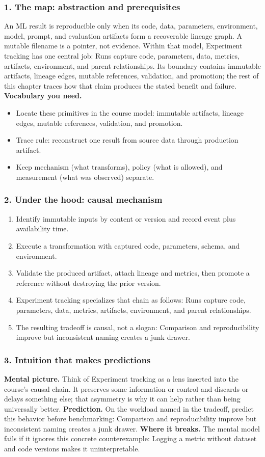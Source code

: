 \subsubsection*{1. The map: abstraction and prerequisites}
An ML result is reproducible only when its code, data, parameters, environment, model, prompt, and evaluation artifacts form a recoverable lineage graph. A mutable filename is a pointer, not evidence.
Within that model, Experiment tracking has one central job: Runs capture code, parameters, data, metrics, artifacts, environment, and parent relationships. Its boundary contains immutable artifacts, lineage edges, mutable references, validation, and promotion; the rest of this chapter traces how that claim produces the stated benefit and failure.
\textbf{Vocabulary you need.}\begin{itemize}
\item Locate these primitives in the course model: immutable artifacts, lineage edges, mutable references, validation, and promotion.
\item Trace rule: reconstruct one result from source data through production artifact.
\item Keep mechanism (what transforms), policy (what is allowed), and measurement (what was observed) separate.
\end{itemize}
\subsubsection*{2. Under the hood: causal mechanism}\begin{enumerate}
\item Identify immutable inputs by content or version and record event plus availability time.
\item Execute a transformation with captured code, parameters, schema, and environment.
\item Validate the produced artifact, attach lineage and metrics, then promote a reference without destroying the prior version.
\item Experiment tracking specializes that chain as follows: Runs capture code, parameters, data, metrics, artifacts, environment, and parent relationships.
\item The resulting tradeoff is causal, not a slogan: Comparison and reproducibility improve but inconsistent naming creates a junk drawer.
\end{enumerate}
\subsubsection*{3. Intuition that makes predictions}
\textbf{Mental picture.} Think of Experiment tracking as a lens inserted into the course's causal chain. It preserves some information or control and discards or delays something else; that asymmetry is why it can help rather than being universally better.
\textbf{Prediction.} On the workload named in the tradeoff, predict this behavior before benchmarking: Comparison and reproducibility improve but inconsistent naming creates a junk drawer.
\textbf{Where it breaks.} The mental model fails if it ignores this concrete counterexample: Logging a metric without dataset and code versions makes it uninterpretable.
